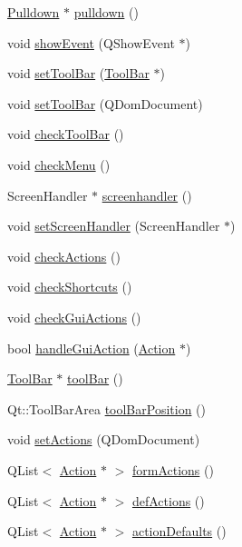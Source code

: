 \begin{DoxyCompactItemize}
\item 
\hyperlink{classPulldown}{Pulldown} $\ast$ \hyperlink{classFglForm_a05f163612a936468e8fac3e84aeec02e}{pulldown} ()
\item 
void \hyperlink{classFglForm_a81b6a444e67df3a3e56ff786fe9099b7}{showEvent} (QShowEvent $\ast$)
\item 
void \hyperlink{classFglForm_acf0280c2e7ca7d56bc45c822b8fb9468}{setToolBar} (\hyperlink{classToolBar}{ToolBar} $\ast$)
\item 
void \hyperlink{classFglForm_ad139148f573546a3ef5ead0f49170d08}{setToolBar} (QDomDocument)
\item 
void \hyperlink{classFglForm_a7490e381d17c7644c7f37a58d5ffa9b4}{checkToolBar} ()
\item 
void \hyperlink{classFglForm_ab7d3ed99ee7eac4b6b781e576d33a1ea}{checkMenu} ()
\item 
ScreenHandler $\ast$ \hyperlink{classFglForm_aebb86e0bc590b730ff490b030b5dba7c}{screenhandler} ()
\item 
void \hyperlink{classFglForm_aba5859f32918808eb18606b85483a4c6}{setScreenHandler} (ScreenHandler $\ast$)
\item 
void \hyperlink{classFglForm_ad806af9cecf975dc4abe1e12eb52864a}{checkActions} ()
\item 
void \hyperlink{classFglForm_a3770f9b34c38cb5bc3f66a7e388c43ce}{checkShortcuts} ()
\item 
void \hyperlink{classFglForm_a60718980fe99888336db588976319382}{checkGuiActions} ()
\item 
bool \hyperlink{classFglForm_ab44742db0c6d0d2e0663db22c9668b4c}{handleGuiAction} (\hyperlink{classAction}{Action} $\ast$)
\item 
\hyperlink{classToolBar}{ToolBar} $\ast$ \hyperlink{classFglForm_ae474767d66111cda958e191e6be1e34d}{toolBar} ()
\item 
Qt::ToolBarArea \hyperlink{classFglForm_acca25b6cbf4161c7075fb594a556eb9a}{toolBarPosition} ()
\item 
void \hyperlink{classFglForm_a4b9c2e9963530fba9dc68f9dae0928a0}{setActions} (QDomDocument)
\item 
QList$<$ \hyperlink{classAction}{Action} $\ast$ $>$ \hyperlink{classFglForm_ac8a66ae6b84ca24c622a87eb631a4834}{formActions} ()
\item 
QList$<$ \hyperlink{classAction}{Action} $\ast$ $>$ \hyperlink{classFglForm_a1a92c94c67dd0ff9d8ff48c3fc64dcf9}{defActions} ()
\item 
QList$<$ \hyperlink{classAction}{Action} $\ast$ $>$ \hyperlink{classFglForm_aa65ef0a575b40217c5fbbe71c6faaf28}{actionDefaults} ()

\end{DoxyCompactItemize}
